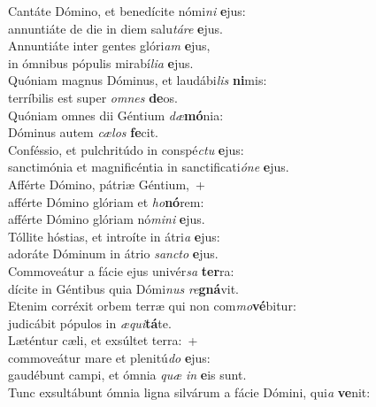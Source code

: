 \evenverse Cantáte Dómino, et benedícite nómi\textit{ni} \textbf{e}jus:~\*\\
\evenverse annuntiáte de die in diem salu\textit{tá}\textit{re} \textbf{e}jus.\\
\oddverse Annuntiáte inter gentes glóri\textit{am} \textbf{e}jus,~\*\\
\oddverse in ómnibus pópulis mirabí\textit{li}\textit{a} \textbf{e}jus.\\
\evenverse Quóniam magnus Dóminus, et laudábi\textit{lis} \textbf{ni}mis:~\*\\
\evenverse terríbilis est super \textit{om}\textit{nes} \textbf{de}os.\\
\oddverse Quóniam omnes dii Géntium \textit{dæ}\textbf{mó}nia:~\*\\
\oddverse Dóminus autem \textit{cæ}\textit{los} \textbf{fe}cit.\\
\evenverse Conféssio, et pulchritúdo in conspé\textit{ctu} \textbf{e}jus:~\*\\
\evenverse sanctimónia et magnificéntia in sanctificati\textit{ó}\textit{ne} \textbf{e}jus.\\
\oddverse Afférte Dómino, pátriæ Géntium,~+\\
\oddverse  afférte Dómino glóriam et \textit{ho}\textbf{nó}rem:~\*\\
\oddverse afférte Dómino glóriam nó\textit{mi}\textit{ni} \textbf{e}jus.\\
\evenverse Tóllite hóstias, et introíte in átri\textit{a} \textbf{e}jus:~\*\\
\evenverse adoráte Dóminum in átrio \textit{san}\textit{cto} \textbf{e}jus.\\
\oddverse Commoveátur a fácie ejus univér\textit{sa} \textbf{ter}ra:~\*\\
\oddverse dícite in Géntibus quia Dómi\textit{nus} \textit{re}\textbf{gná}vit.\\
\evenverse Etenim corréxit orbem terræ qui non com\textit{mo}\textbf{vé}bitur:~\*\\
\evenverse judicábit pópulos in \textit{æ}\textit{qui}\textbf{tá}te.\\
\oddverse Læténtur cæli, et exsúltet terra:~+\\
\oddverse  commoveátur mare et plenitú\textit{do} \textbf{e}jus:~\*\\
\oddverse gaudébunt campi, et ómnia \textit{quæ} \textit{in} \textbf{e}is sunt.\\
\evenverse Tunc exsultábunt ómnia ligna silvárum a fácie Dómini, qui\textit{a} \textbf{ve}nit:~\*\\

